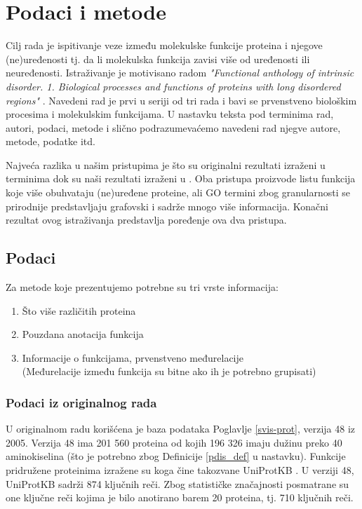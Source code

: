 
\chapter{Podaci i metode} %

\label{Podaci i metode} %

Cilj rada je ispitivanje veze između molekulske funkcije proteina i njegove
(ne)uređenosti tj. da li molekulska funkcija zavisi više od uređenosti ili
neuređenosti. Istraživanje je motivisano radom \textit{"Functional anthology of
intrinsic disorder. 1. Biological processes and functions of proteins with long
disordered regions"} \parencite{Xie2007}. Navedeni rad je prvi u seriji od 
tri rada i bavi se prvenstveno biološkim procesima i molekulskim funkcijama.
U nastavku teksta pod terminima  rad, autori, podaci, metode i slično 
podrazumevaćemo navedeni rad njegve autore, metode, podatke itd.

Najveća razlika u našim pristupima je što su originalni rezultati izraženi u
terminima  dok su naši rezultati izraženi u . Oba pristupa proizvode listu funkcija koje više obuhvataju
(ne)uređene proteine, ali GO termini zbog granularnosti se prirodnije
predstavljaju grafovski i sadrže mnogo više informacija. Konačni rezultat
ovog istraživanja predstavlja poređenje ova dva pristupa.


\section {Podaci}

Za metode koje prezentujemo potrebne su tri vrste informacija:
\begin{enumerate}
  \item Što više različitih proteina
  \item Pouzdana anotacija funkcija
  \item Informacije o funkcijama, prvenstveno međurelacije\\
    (Međurelacije između funkcija su bitne  ako ih je potrebno grupisati)
\end{enumerate}


\subsection{Podaci iz originalnog rada}

U originalnom radu \parencite{Xie2007} korišćena je  baza podataka 
\keyword{\swissprot} Poglavlje \ref{svis-prot}, verzija 48 iz 2005.
Verzija 48 ima 201 560 proteina od kojih 196 326 imaju dužinu preko 40
aminokiselina (što je potrebno zbog Definicije \ref{pdis_def} u nastavku). Funkcije
pridružene proteinima izražene su 
 koga čine takozvane UniProtKB 
. U verziji 48, UniProtKB sadrži 874 ključnih reči.  Zbog
statističke značajnosti posmatrane su one ključne reči kojima je bilo anotirano
barem 20 proteina, tj. 710 ključnih reči.

